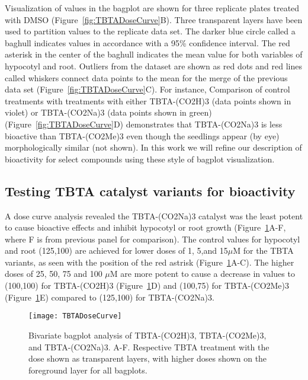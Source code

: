 Visualization of values in the bagplot are shown for three replicate plates treated with DMSO (Figure~\ref{fig:TBTADoseCurve}B). Three transparent layers have been used to partition values to the replicate data set. The darker blue circle called a baghull indicates values in accordance with a 95{\%} confidence interval. The red asterisk in the center of the baghull indicates the mean value for both variables of hypocotyl and root. Outliers from the dataset are shown as red dots and red lines called whiskers connect data points to the mean for the merge of the previous data set (Figure~\ref{fig:TBTADoseCurve}C). For instance, Comparison of control treatments with treatments with either TBTA-(CO2H)3 (data points shown in violet) or TBTA-(CO2Na)3 (data points shown in green) (Figure~\ref{fig:TBTADoseCurve}D) demonstrates that TBTA-(CO2Na)3 is less bioactive than TBTA-(CO2Me)3 even though the seedlings appear (by eye) morphologically similar (not shown). In this work we will refine our description of bioactivity for select compounds using these style of bagplot visualization. 

\subsection{Testing TBTA catalyst variants for bioactivity}

A dose curve analysis revealed the TBTA-(CO2Na)3 catalyst was the least potent to cause bioactive effects and inhibit hypocotyl or root growth (Figure~\ref{fig:TBTADoseCurve2}A-F, where F is from previous panel for comparison). The control values for hypocotyl and root (125,100) are achieved for lower doses of 1, 5,and 15$\mu$M for the TBTA variants, as seen with the position of the red astrisk (Figure~\ref{fig:TBTADoseCurve2}A-C). The higher doses of 25, 50, 75 and 100 $\mu$M are more potent to cause a decrease in values to (100,100) for TBTA-(CO2H)3 (Figure~\ref{fig:TBTADoseCurve2}D) and (100,75) for TBTA-(CO2Me)3 (Figure~\ref{fig:TBTADoseCurve2}E) compared to (125,100) for TBTA-(CO2Na)3. 


\begin{figure}
\texttt{[image: TBTADoseCurve]}
\caption{Bivariate bagplot analysis of TBTA-(CO2H)3, TBTA-(CO2Me)3, and TBTA-(CO2Na)3. A-F.  Respective TBTA treatment with the dose shown as transparent layers, with higher doses shown on the foreground layer for all bagplots.}
\label{fig:TBTADoseCurve2}
\end{figure}


